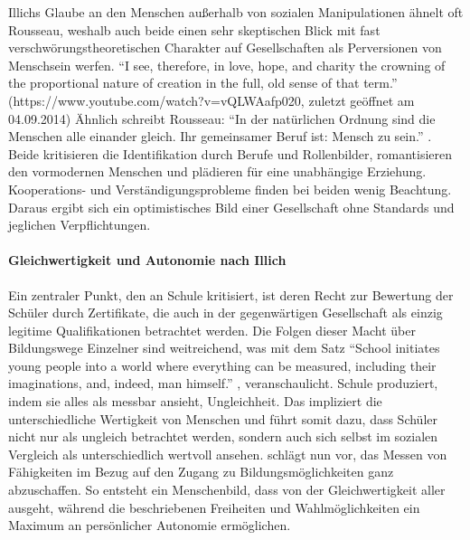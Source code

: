 Illichs Glaube an den Menschen außerhalb von sozialen Manipulationen ähnelt oft Rousseau, weshalb auch beide einen sehr skeptischen Blick mit fast verschwörungstheoretischen Charakter auf Gesellschaften als Perversionen von Menschsein werfen.
``I see, therefore, in love, hope, and charity the crowning of the proportional nature of creation in the full, old sense of that term.'' (https://www.youtube.com/watch?v=vQLWAafp020, zuletzt geöffnet am 04.09.2014)
Ähnlich schreibt Rousseau: ``In der natürlichen Ordnung sind die Menschen alle einander gleich. Ihr gemeinsamer Beruf ist: Mensch zu sein.'' \parencite[50]{rousseau-1762}.
Beide kritisieren die Identifikation durch Berufe und Rollenbilder, romantisieren den vormodernen Menschen und plädieren für eine unabhängige Erziehung.
Kooperations- und Verständigungsprobleme finden bei beiden wenig Beachtung.
Daraus ergibt sich ein optimistisches Bild einer Gesellschaft ohne Standards und jeglichen Verpflichtungen.


\paragraph{Gleichwertigkeit und Autonomie nach Illich}

Ein zentraler Punkt, den \citeauthor{Illich-1971} an Schule kritisiert, ist deren Recht zur Bewertung der Schüler durch Zertifikate, die auch in der gegenwärtigen Gesellschaft als einzig legitime Qualifikationen betrachtet werden.
Die Folgen dieser Macht über Bildungswege Einzelner sind weitreichend, was \citeauthor{Illich-1971} mit dem Satz ``School initiates young people into a world where everything can be measured, including their imaginations, and, indeed, man himself.'' \parencite[19]{Illich-1971}, veranschaulicht.
Schule produziert, indem sie alles als messbar ansieht, Ungleichheit.
Das impliziert die unterschiedliche Wertigkeit von Menschen und führt somit dazu, dass Schüler nicht nur als ungleich betrachtet werden, sondern auch sich selbst im sozialen Vergleich als unterschiedlich wertvoll ansehen.
\citeauthor{Illich-1971} schlägt nun vor, das Messen von Fähigkeiten im Bezug auf den Zugang zu Bildungsmöglichkeiten ganz abzuschaffen.
So entsteht ein Menschenbild, dass von der Gleichwertigkeit aller ausgeht, während die beschriebenen Freiheiten und Wahlmöglichkeiten ein Maximum an persönlicher Autonomie ermöglichen.
